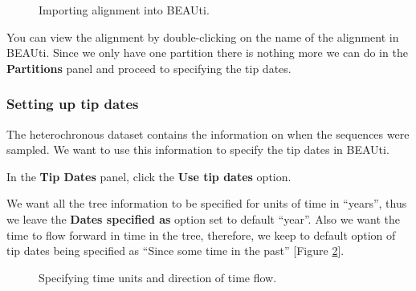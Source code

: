 \documentclass[11pt]{article}
\begin{document}
\begin{figure}[h!]
\centering
{}
\caption{\small Importing alignment into BEAUti.}
\label{importAlignment}
\end{figure}

You can view the alignment by double-clicking on the name of the alignment in BEAUti. Since we only have one partition there is nothing more we can do in the \textbf{Partitions} panel and proceed to specifying the tip dates. 



\bigskip
\subsubsection{Setting up tip dates}

The heterochronous dataset contains the information on when the sequences were sampled. We want to use this information to specify the tip dates in BEAUti. 

\begin{framed}
In the \textbf{Tip Dates} panel, click the \textbf{Use tip dates} option. 
\end{framed}

We want all the tree information to be specified for units of time in ``years'', thus we leave the \textbf{Dates specified as} option set to default ``year''. Also we want the time to flow forward in time in the tree, therefore, we keep to default option of tip dates being specified as ``Since some time in the past'' [Figure \ref{timeUnitsAndFlow}].

\begin{figure}[h!]
\centering
{}
\caption{\small Specifying time units and direction of time flow.}
\label{timeUnitsAndFlow}
\end{figure}
\end{document}
